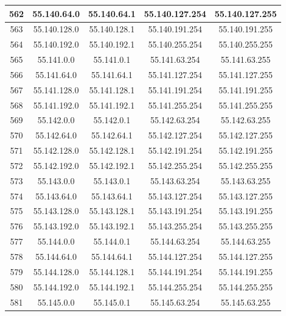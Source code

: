 \documentclass[letterpaper,12pt]{article}
\begin{document}
\begin{center}
\begin{longtable}{|c|c|c|c|c|}
                562 & 55.140.64.0 & 55.140.64.1 & 55.140.127.254 & 55.140.127.255 \\ \hline
                563 & 55.140.128.0 & 55.140.128.1 & 55.140.191.254 & 55.140.191.255 \\ \hline
                564 & 55.140.192.0 & 55.140.192.1 & 55.140.255.254 & 55.140.255.255 \\ \hline
                565 & 55.141.0.0 & 55.141.0.1 & 55.141.63.254 & 55.141.63.255 \\ \hline
                566 & 55.141.64.0 & 55.141.64.1 & 55.141.127.254 & 55.141.127.255 \\ \hline
                567 & 55.141.128.0 & 55.141.128.1 & 55.141.191.254 & 55.141.191.255 \\ \hline
                568 & 55.141.192.0 & 55.141.192.1 & 55.141.255.254 & 55.141.255.255 \\ \hline
                569 & 55.142.0.0 & 55.142.0.1 & 55.142.63.254 & 55.142.63.255 \\ \hline
                570 & 55.142.64.0 & 55.142.64.1 & 55.142.127.254 & 55.142.127.255 \\ \hline
                571 & 55.142.128.0 & 55.142.128.1 & 55.142.191.254 & 55.142.191.255 \\ \hline
                572 & 55.142.192.0 & 55.142.192.1 & 55.142.255.254 & 55.142.255.255 \\ \hline
                573 & 55.143.0.0 & 55.143.0.1 & 55.143.63.254 & 55.143.63.255 \\ \hline
                574 & 55.143.64.0 & 55.143.64.1 & 55.143.127.254 & 55.143.127.255 \\ \hline
                575 & 55.143.128.0 & 55.143.128.1 & 55.143.191.254 & 55.143.191.255 \\ \hline
                576 & 55.143.192.0 & 55.143.192.1 & 55.143.255.254 & 55.143.255.255 \\ \hline
                577 & 55.144.0.0 & 55.144.0.1 & 55.144.63.254 & 55.144.63.255 \\ \hline
                578 & 55.144.64.0 & 55.144.64.1 & 55.144.127.254 & 55.144.127.255 \\ \hline
                579 & 55.144.128.0 & 55.144.128.1 & 55.144.191.254 & 55.144.191.255 \\ \hline
                580 & 55.144.192.0 & 55.144.192.1 & 55.144.255.254 & 55.144.255.255 \\ \hline
                581 & 55.145.0.0 & 55.145.0.1 & 55.145.63.254 & 55.145.63.255 \\ \hline

\end{longtable}
\end{center}
\end{document}
